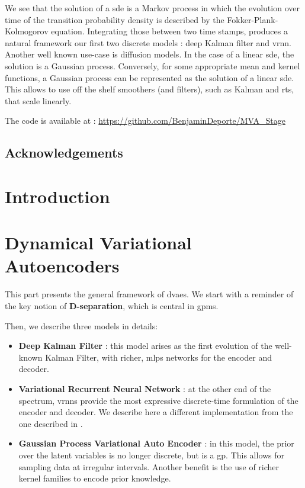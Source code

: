 \documentclass[twoside,11pt]{report}
\begin{document}
We see that the solution of a \gls{sde} is a Markov process in which the evolution over time of the transition probability density is described by the Fokker-Plank-Kolmogorov equation. Integrating those between two
time stamps, produces a natural framework our first two discrete models : deep Kalman filter and \gls{vrnn}. Another well known 
use-case is diffusion models. In the case of a linear \gls{sde}, the solution is a Gaussian process. Conversely, for some appropriate mean and kernel functions, 
a Gaussian process can be represented as the solution of a linear \gls{sde}. This allows to use off the shelf smoothers (and filters), such as Kalman and \gls{rts}, that scale linearly.

The code is available at : \url{https://github.com/BenjaminDeporte/MVA_Stage}

\chapter*{Acknowledgements}



\newpage
\singlespacing
\tableofcontents

\newpage
\listoffigures

\part{Introduction}
    
    
    
    

%
%
%
%
\part{Dynamical Variational Autoencoders}

This part presents the general framework of \glspl{dvae}. We start with a reminder of the key notion of \textbf{D-separation}, which is central in \glspl{gpm}.

Then, we describe three models in details:
\begin{itemize}
    \item \textbf{Deep Kalman Filter} : this model arises as the first evolution of the well-known Kalman Filter, with richer, \glspl{mlp} networks for the encoder and decoder.
    \item \textbf{Variational Recurrent Neural Network} : at the other end of the spectrum, \glspl{vrnn} provide the most expressive discrete-time formulation of the encoder and decoder.
We describe here a different implementation from the one described in \cite{girin_dynamical_2022}.
    \item \textbf{Gaussian Process Variational Auto Encoder} : in this model, the prior over the latent variables is no longer discrete, but is a \gls{gp}.
This allows for sampling data at irregular intervals. Another benefit is the use of richer kernel families to encode prior knowledge.
\end{itemize}
\end{document}

